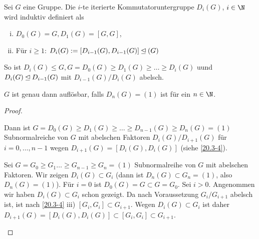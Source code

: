 \begin{df} \label{20.3-5}
	Sei $G$ eine Gruppe.
	Die $i$-te iterierte Kommutatoruntergruppe $D_i(G)$, $i \in \N$ wird induktiv definiert als
	\begin{enumerate}[i)]
		\item
			$D_0(G) = G, D_1(G) = [G, G]$,
		\item
			Für $i \ge 1$: $D_i(G) := [D_{i-1}(G), D_{i-1}(G)] \mathbin{\trianglelefteq}(G)$
	\end{enumerate}
	So ist $D_i(G) \le G, G = D_0(G) \ge D_1(G) \ge \dotsc \ge D_i(G)$ uund $D_i(G) \mathbin{\trianglelefteq} D_{i-1}(G)$ mit $D_{i-1}(G) / D_i(G)$ abelsch.
\end{df}

\begin{st} \label{20.3-6}
	$G$ ist genau dann auflösbar, falls $D_n(G) = (1)$ ist für ein $n \in \N$.
	\begin{proof}
		\begin{segnb}{\ProofImplication*}
			Dann ist $G = D_0(G) \ge D_1(G) \ge \dotsc \ge D_{n-1}(G) \ge D_n(G) = (1)$ Subnormalreiche von $G$ mit abelschen Faktoren $D_i(G) / D_{i+1}(G)$ für $i = 0, \dotsc, n-1$ wegen $D_{i+1}(G) = [D_i(G), D_i(G)]$ (siehe \ref{20.3-4}).

		\end{segnb}
		\begin{segnb}{\ProofImplication}
			Sei $G = G_0 \ge G_1 \dotsc \ge G_{n-1} \ge G_n = (1)$ Subnormalreihe von $G$ mit abelschen Faktoren.
			Wir zeigen $D_i(G) \subset G_i$ (dann ist $D_n(G) \subset G_n = (1)$, also $D_n(G) = (1)$).
			Für $i = 0$ ist $D_0(G) = G \subset G = G_0$.
			Sei $i > 0$.
			Angenommen wir haben $D_i(G) \subset G_i$ schon gezeigt.
			Da nach Voraussetzung $G_i / G_{i+1}$ abelsch ist, ist nach \ref{20.3-4} iii) $[G_i, G_i] \subset G_{i+1}$.
			Wegen $D_i(G) \subset G_i$ ist daher $D_{i+1}(G) = [D_i(G), D_i(G)] \subset [G_i, G_i]\subset G_{i+1}$.
		\end{segnb}
	\end{proof}
\end{st}

